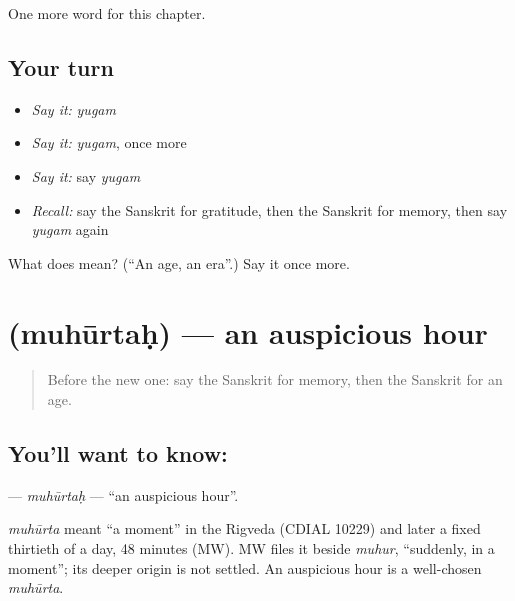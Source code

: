 \begin{grammarlens}[title={What you've built}]
One more word for this chapter.
\end{grammarlens}

\subsection*{Your turn}
\begin{itemize}
\raggedright
  \item \emph{Say it:} \emph{yugam}
  \item \emph{Say it:} \emph{yugam}, once more
  \item \emph{Say it:} say \emph{yugam}
  \item \emph{Recall:} say the Sanskrit for gratitude, then the Sanskrit for memory, then say \emph{yugam} again
\end{itemize}

\begin{tcolorbox}[breakable,colback=teal!4,colframe=teal!35!black,title={Before you move on}]
What does  mean? (\textquotedblleft{}An age, an era\textquotedblright{}.) Say it once more.
\end{tcolorbox}
\section[\texorpdfstring{\sk{मुहूर्तः} (muhūrtaḥ)}{मुहूर्तः (muhūrtaḥ)}]{ (muhūrtaḥ) — an auspicious hour}

\label{lesson:SA-C183-muhurtah}



\begin{quote}
Before the new one: say the Sanskrit for memory, then the Sanskrit for an age.
\end{quote}

\subsection*{You'll want to know: }
\textbf{} — \emph{muhūrtaḥ} — \textquotedblleft{}an auspicious hour\textquotedblright{}.

\begin{cousinweb}
\emph{muhūrta} meant \textquotedblleft{}a moment\textquotedblright{} in the Rigveda (CDIAL 10229) and later a fixed thirtieth of a day, 48 minutes (MW). MW files it beside \emph{muhur}, \textquotedblleft{}suddenly, in a moment\textquotedblright{}; its deeper origin is not settled. An auspicious hour is a well-chosen \emph{muhūrta}.
\end{cousinweb}

